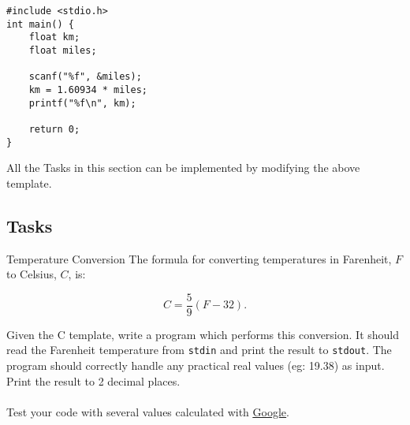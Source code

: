 \documentclass{lab}
\begin{document}
\begin{lstlisting}[style=CStyle]
#include <stdio.h>
int main() {
	float km;
	float miles;
	
	scanf("%f", &miles);
	km = 1.60934 * miles;
	printf("%f\n", km);
	
	return 0;
}
\end{lstlisting}

All the Tasks in this section can be implemented by modifying the above template.

\pagebreak
\subsection{Tasks}
\begin{task}{Temperature Conversion}{}
The formula for converting temperatures in Farenheit, $F$ to Celsius, $C$, is:

\begin{equation}\label{eq:temp}
C = \frac{5}{9}(F - 32).
\end{equation}

Given the C template, write a program which performs this conversion. It should read the Farenheit temperature from \texttt{stdin} and print the result to \texttt{stdout}. The program should correctly handle any practical real values (eg: 19.38) as input. Print the result to 2 decimal places.
\\ \\
Test your code with several values calculated with \underline{\href{https://www.google.com.au/search?q=farenheit+to+celsius}{Google}}.
\end{task}
\end{document}
